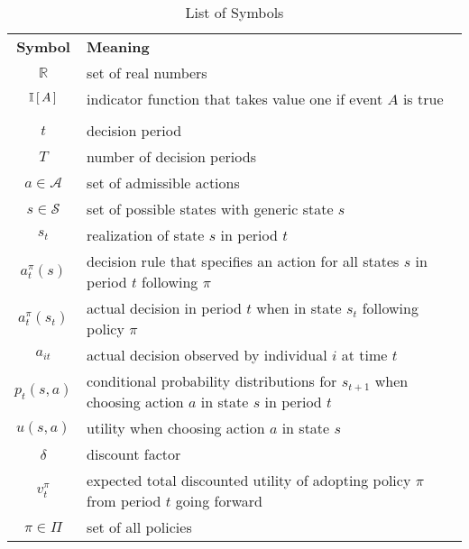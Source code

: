 \bgroup
\def\arraystretch{1.5}%
\tabulinesep=4.0mm
\begin{longtabu} to \textwidth{CL}
\caption{List of Symbols}
\setlength\extrarowheight{0pt}\\ %
\bottomrule
\textbf{Symbol} & \textbf{Meaning} \\\midrule
\endhead
\bottomrule
\endfoot
    $\mathbb{R}$                        & set of real numbers\\
    $\mathbb{I}\,[\,A\,]$                       & indicator function that takes value one if event $A$ is true\\
    \midrule{}\\\midrule
    $t$                                 & decision period \\
    $T$                                 & number of decision periods\\
    $a \in \mathcal{A}$                 & set of admissible actions\\
    $s \in \mathcal{S}$                 & set of possible states with generic state $s$\\
    $s_t$                               & realization of state $s$ in period $t$\\
    $a^\pi_t(s)$                        & decision rule that specifies an action for all states $s$ in period $t$ following $\pi$\\
    $a^\pi_t(s_t)$                      & actual decision in period $t$ when in state $s_t$ following policy $\pi$\\
    $a_{it}$                            & actual decision observed by individual $i$ at time $t$\\
    $p_t(s, a)$                         & conditional probability distributions for $s_{t + 1}$ when choosing action $a$ in state $s$ in period $t$\\
    $u(s, a)$                           & utility when choosing action $a$ in state $s$\\
    $\delta$                            & discount factor\\
    $v^\pi_t$                           & expected total discounted utility of adopting policy $\pi$ from period $t$ going forward\\
    $\pi \in \Pi$                       & set of all policies\\

\end{longtabu}
